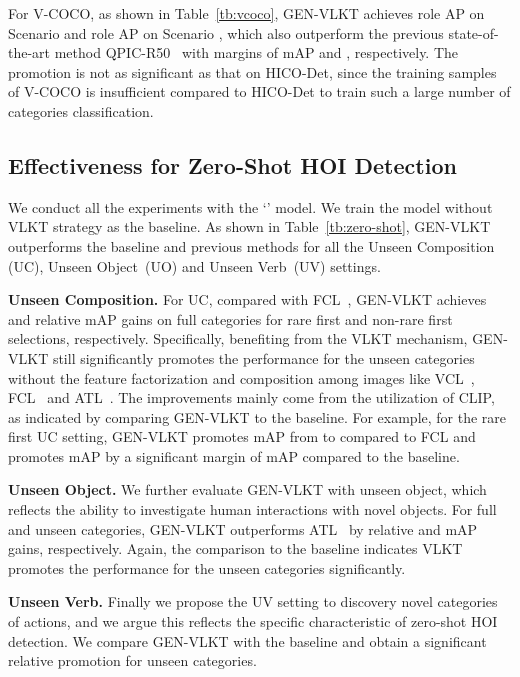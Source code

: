 \documentclass[10pt,twocolumn,letterpaper]{article}
\begin{document}
For V-COCO, as shown in Table~\ref{tb:vcoco}, GEN-VLKT achieves role AP  on Scenario  and role AP  on Scenario , which also outperform the previous state-of-the-art method QPIC-R50~\cite{tamura2021qpic} with margins of mAP  and , respectively. 
The promotion is not as significant as that on HICO-Det, since the training samples of V-COCO is insufficient compared to HICO-Det to train such a large number of  categories classification.


\vspace{-1.5mm}\subsection{Effectiveness for Zero-Shot HOI Detection}\label{sec:zero-shot}\vspace{-1.5mm}

We conduct all the experiments with the `' model. We train the model without VLKT strategy as the baseline. As shown in Table~\ref{tb:zero-shot}, GEN-VLKT outperforms the baseline and previous methods for all the Unseen Composition (UC), Unseen Object~(UO) and Unseen Verb~(UV) settings. 

\vspace{1mm}\noindent\textbf{Unseen Composition.} For UC, compared with FCL~\cite{hou2021detecting}, GEN-VLKT achieves  and  relative mAP gains on full categories for rare first and non-rare first selections, respectively. Specifically, benefiting from the VLKT mechanism, GEN-VLKT still significantly promotes the performance for the unseen categories without the feature factorization and composition among images like VCL~\cite{hou2020visual}, FCL~\cite{hou2021detecting} and ATL~\cite{hou2021affordance}. The improvements mainly come from the utilization of CLIP, as indicated by comparing GEN-VLKT to the baseline. For example, for the rare first UC setting, GEN-VLKT promotes mAP from  to  compared to FCL and promotes mAP by a significant margin of mAP  compared to the baseline. 

\vspace{0.5mm}\noindent\textbf{Unseen Object.} We further evaluate GEN-VLKT with unseen object, which reflects the ability to investigate human interactions with novel objects. For full and unseen categories, GEN-VLKT outperforms ATL~\cite{hou2021affordance} by relative  and  mAP gains, respectively. Again, the comparison to the baseline indicates VLKT promotes the performance for the unseen categories significantly.

\vspace{0.5mm}\noindent\textbf{Unseen Verb.} Finally we propose the UV setting to discovery novel categories of actions, and we argue this reflects the specific characteristic of zero-shot HOI detection. We compare GEN-VLKT with the baseline and obtain a significant  relative promotion for unseen categories.
\end{document}
